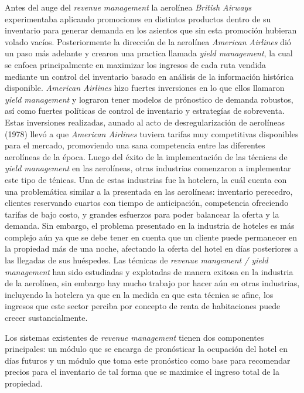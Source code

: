 Antes del auge del \emph{revenue management} la aerolínea \emph{British Airways} experimentaba aplicando promociones en distintos productos dentro de su inventario para generar demanda en los asientos que sin esta promoción hubieran volado vacíos. Posteriormente la dirección de la aerolínea \emph{American Airlines} dió un paso más adelante y crearon una practica llamada \emph{yield management}, la cual se enfoca principalmente en maximizar los ingresos de cada ruta vendida mediante un control del inventario basado en análisis de la información histórica disponible. \emph{American Airlines} hizo fuertes inversiones en lo que ellos llamaron \emph{yield management} y lograron tener modelos de prónostico de demanda robustos, así como fuertes políticas de control de inventario y estrategías de sobreventa. Estas inversiones realizadas, aunado al acto de desregularización de aerolíneas (1978) llevó a que \emph{American Airlines} tuviera tarifas muy competitivas disponibles para el mercado, promoviendo una sana competencia entre las diferentes aerolíneas de la época.
Luego del éxito de la implementación de las técnicas de \emph{yield management} en las aerolíneas, otras industrias comenzaron a implementar este tipo de ténicas. Una de estas industrias fue la hotelera, la cuál cuenta con una problemática similar a la presentada en las aerolíneas: inventario perecedro, clientes reservando cuartos con tiempo de anticipación, competencia ofreciendo tarifas de bajo costo, y grandes esfuerzos para poder balancear la oferta y la demanda. Sin embargo, el problema presentado en la industria de hoteles es más complejo aún ya que se debe tener en cuenta que un cliente puede permanecer en la propiedad más de una noche, afectando la oferta del hotel en días posteriores a las llegadas de sus huéspedes.
Las técnicas de \emph{revenue mangement / yield management} han sido estudiadas y explotadas de manera exitosa en la industria de la aerolínea, sin embargo hay mucho trabajo por hacer aún en otras industrias, incluyendo la hotelera ya que en la medida en que esta técnica se afine, los ingresos que este sector perciba por concepto de renta de habitaciones puede crecer sustancialmente.

Los sistemas existentes de \emph{revenue management} tienen dos componentes principales: un módulo que se encarga de pronósticar la ocupación del hotel en días futuros y un módulo que toma este pronóstico como base para recomendar precios para el inventario de tal forma que se maximice el ingreso total de la propiedad. 

